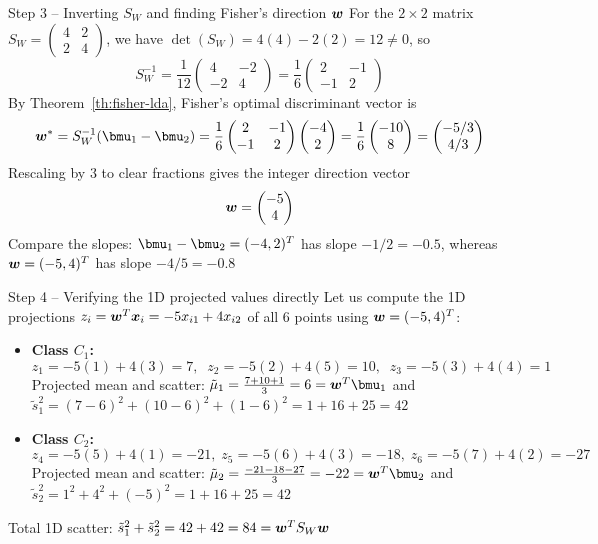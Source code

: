 \documentclass[aspectratio=169]{beamer}\usepackage[]{graphicx}\usepackage[]{xcolor}
\begin{document}
\begin{frame}{Step 3 -- Inverting $S_W$ and finding Fisher's direction $\bm{w}$}
    For the $2 \times 2$ matrix $S_W = \begin{pmatrix} 4 & 2 \\ 2 & 4 \end{pmatrix}$, we have $\det(S_W) = 4(4) - 2(2) = 12 \neq 0$, so
    \[
        S_W^{-1} = \frac{1}{12}\begin{pmatrix} 4 & -2 \\ -2 & 4 \end{pmatrix} = \frac{1}{6}\begin{pmatrix} 2 & -1 \\ -1 & 2 \end{pmatrix}
    \]
    \vfill
    By Theorem~\ref{th:fisher-lda}, Fisher's optimal discriminant vector is
    \[
        \bw^* = S_W^{-1}(\bmu_1 - \bmu_2) = \frac{1}{6}\begin{pmatrix} 2 & -1 \\ -1 & 2 \end{pmatrix}\begin{pmatrix} -4 \\ 2 \end{pmatrix} = \frac{1}{6}\begin{pmatrix} -10 \\ 8 \end{pmatrix} = \begin{pmatrix} -5/3 \\ 4/3 \end{pmatrix}
    \]
    \vfill
    Rescaling by $3$ to clear fractions gives the integer direction vector
    \[
        \bm{w} = \begin{pmatrix} -5 \\ 4 \end{pmatrix}
    \]
    Compare the slopes: $\bmu_1 - \bmu_2 = (-4, 2)^T$ has slope $-1/2 = -0.5$, whereas $\bm{w} = (-5, 4)^T$ has slope $-4/5 = -0.8$
\end{frame}


\begin{frame}{Step 4 -- Verifying the 1D projected values directly}
    Let us compute the 1D projections $z_i = \bm{w}^T \bm{x}_i = -5x_{i1} + 4x_{i2}$ of all 6 points using $\bm{w} = (-5, 4)^T$:
    \vfill
    \begin{itemize}
        \item \textbf{Class $C_1$:}
        \[
            z_1 = -5(1) + 4(3) = 7, \;\; z_2 = -5(2) + 4(5) = 10, \;\; z_3 = -5(3) + 4(4) = 1
        \]
        Projected mean and scatter: $\tilde{\mu}_1 = \frac{7 + 10 + 1}{3} = 6 = \bw^T \bmu_1$ and $\tilde{s}_1^2 = (7 - 6)^2 + (10 - 6)^2 + (1 - 6)^2 = 1 + 16 + 25 = 42$
        \vfill
        \item \textbf{Class $C_2$:}
        \[
            z_4 = -5(5) + 4(1) = -21, \; z_5 = -5(6) + 4(3) = -18, \; z_6 = -5(7) + 4(2) = -27
        \]
        Projected mean and scatter: $\tilde{\mu}_2 = \frac{-21 - 18 - 27}{3} = -22 = \bw^T \bmu_2$ and $\tilde{s}_2^2 = 1^2 + 4^2 + (-5)^2 = 1 + 16 + 25 = 42$
    \end{itemize}
    \vfill
    Total 1D scatter: $\tilde{s}_1^2 + \tilde{s}_2^2 = 42 + 42 = 84 = \bm{w}^T S_W \bm{w}$
\end{frame}
\end{document}
